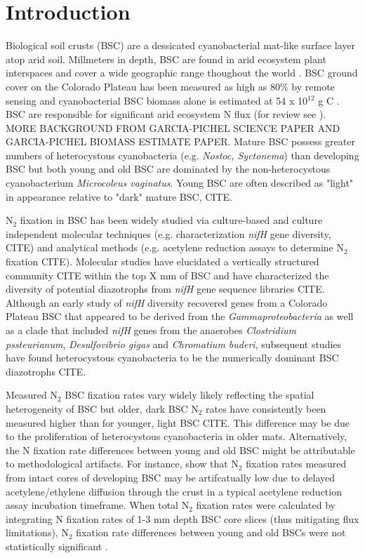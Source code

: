 \section{Introduction}


Biological soil crusts (BSC) are a dessicated cyanobacterial mat-like surface layer atop arid soil. Millmeters in depth, BSC are found in arid ecosystem plant interspaces and cover a wide geographic range thoughout the world \cite{garcia2003estimates}. BSC ground cover on the Colorado Plateau has been measured as high as 80\% by remote sensing \cite{karnieli2001} and cyanobacterial BSC biomass alone is estimated at 54 x 10$^{12}$ g C \cite{garcia2003estimates}. BSC are responsible for significant arid ecosystem N flux (for review see \cite{belnap2003}). MORE BACKGROUND FROM GARCIA-PICHEL SCIENCE PAPER AND GARCIA-PICHEL BIOMASS ESTIMATE PAPER. Mature BSC possess greater numbers of heterocystous cyanobacteria (e.g. \textit{Nostoc, Syctonema}) than developing BSC but both young and old BSC are dominated by the non-heterocystous cyanobacterium \textit{Microcoleus vaginatus}. Young BSC are often described as "light" in appearance relative to "dark" mature BSC, CITE.

N$_{2}$ fixation in BSC has been widely studied via culture-based and culture independent molecular techniques (e.g. characterization \textit{nifH} gene diversity, CITE) and analytical methods (e.g. acetylene reduction assays to determine N$_{2}$ fixation CITE). Molecular studies have elucidated a vertically structured community CITE within the top X mm of BSC and have characterized the diversity of potential diazotrophs from \textit{nifH} gene sequence libraries CITE. Although an early study of \textit{nifH} diversity recovered genes from a Colorado Plateau BSC that appeared to be derived from the \textit{Gammaproteobacteria} as well as a clade that included \textit{nifH} genes from the anaerobes \textit{Clostridium pssteurianum}, \textit{Desulfovibrio gigas} and \textit{Chromatium buderi}, subsequent studies have found heterocystous cyanobacteria to be the numerically dominant BSC diazotrophs CITE. 

Measured N$_{2}$ BSC fixation rates vary widely likely reflecting the spatial heterogeneity of BSC but older, dark BSC N$_{2}$ rates have consistently been measured higher than for younger, light BSC CITE. This difference may be due to the proliferation of heterocystous cyanobacteria in older mats. Alternatively, the N fixation rate differences between young and old BSC might be attributable to methodological artifacts. For instance, \citet{15643930} show that N$_{2}$ fixation rates measured from intact cores of developing BSC may be artifcatually low due to delayed acetylene/ethylene diffusion through the crust in a typical acetylene reduction assay incubation timeframe. When total N$_{2}$ fixation rates were calculated by integrating N fixation rates of 1-3 mm depth BSC core slices (thus mitigating flux limitations), N$_{2}$ fixation rate differences between young and old BSCs were not statistically significant \cite{15643930}.

